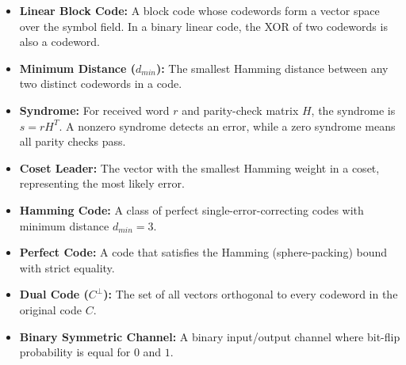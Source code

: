 \documentclass[12pt,a4paper]{article}
\begin{document}
\vspace{6pt}

\begin{tcolorbox}[defbox, title={\textbf{One-Line Definitions}}]
\begin{itemize}[leftmargin=*, itemsep=3pt, topsep=0pt]
  \item \textbf{Linear Block Code:} A block code whose codewords form a vector space over the symbol field. In a binary linear code, the XOR of two codewords is also a codeword.
  \item \textbf{Minimum Distance ($d_{min}$):} The smallest Hamming distance between any two distinct codewords in a code.
  \item \textbf{Syndrome:} For received word $r$ and parity-check matrix $H$, the syndrome is $s=rH^T$. A nonzero syndrome detects an error, while a zero syndrome means all parity checks pass.
  \item \textbf{Coset Leader:} The vector with the smallest Hamming weight in a coset, representing the most likely error.
  \item \textbf{Hamming Code:} A class of perfect single-error-correcting codes with minimum distance $d_{min} = 3$.
  \item \textbf{Perfect Code:} A code that satisfies the Hamming (sphere-packing) bound with strict equality.
  \item \textbf{Dual Code ($C^\perp$):} The set of all vectors orthogonal to every codeword in the original code $C$.
  \item \textbf{Binary Symmetric Channel:} A binary input/output channel where bit-flip probability is equal for $0$ and $1$.
\end{itemize}
\end{tcolorbox}

\newpage
\end{document}
